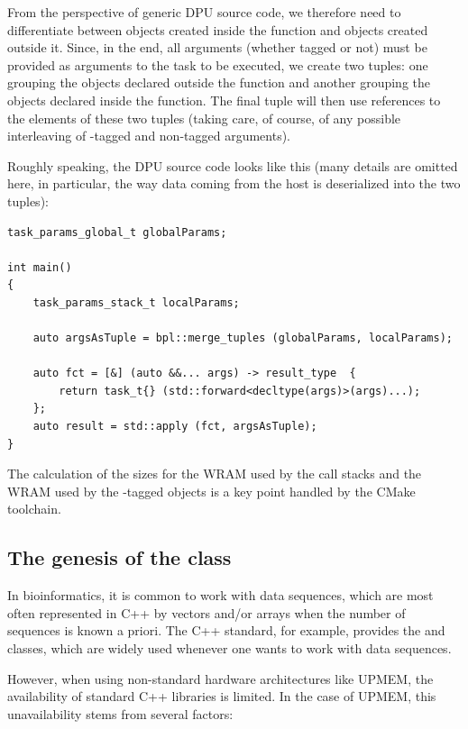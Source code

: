 From the perspective of generic DPU source code, we therefore need to differentiate between objects created inside the  function and objects created outside it. Since, in the end, all arguments (whether tagged  or not) must be provided as arguments to the task to be executed, we create two tuples: one grouping the objects declared outside the  function and another grouping the objects declared inside the  function. The final tuple will then use references to the elements of these two tuples  (taking care, of course, of any possible interleaving of -tagged and non-tagged arguments).

Roughly speaking, the DPU source code looks like this (many details are omitted here, in particular, the way data coming from the host is deserialized into the two tuples):

\begin{verbatim}
task_params_global_t globalParams;

int main() 
{
    task_params_stack_t localParams;

    auto argsAsTuple = bpl::merge_tuples (globalParams, localParams);

    auto fct = [&] (auto &&... args) -> result_type  {
        return task_t{} (std::forward<decltype(args)>(args)...);
    };
    auto result = std::apply (fct, argsAsTuple);
}
\end{verbatim}

The calculation of the sizes for the WRAM used by the call stacks and the WRAM used by the -tagged objects is a key point handled by the CMake toolchain.
   
\subsection{The genesis of the  class}

In bioinformatics, it is common to work with data sequences, which are most often represented in C++ by vectors and/or arrays  when the number of sequences is known a priori. The C++ standard, for example, provides the  and   classes, which are widely used whenever one wants to work with data sequences.

However, when using non-standard hardware architectures like UPMEM, the availability of standard C++ libraries is limited.  In the case of UPMEM, this unavailability stems from several factors:


